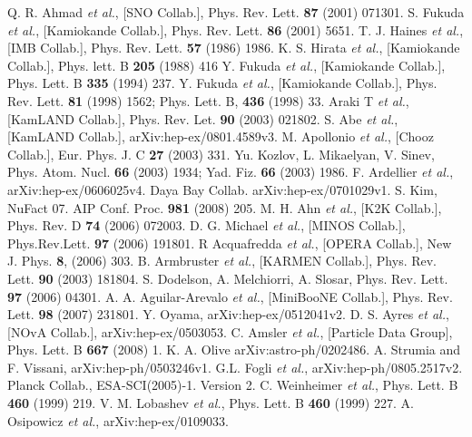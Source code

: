 \begin{thebibliography}{99}
Q. R. Ahmad \textit{et al.}, [SNO Collab.], Phys. Rev.   Lett. \textbf{87} (2001) 071301.
S. Fukuda \textit{et al.}, [Kamiokande Collab.], Phys.   Rev. Lett. \textbf{86} (2001) 5651.
T. J. Haines \textit{et al.}, [IMB Collab.], Phys. Rev.  
Lett. \textbf{57} (1986) 1986.
K. S. Hirata \textit{et al.}, [Kamiokande Collab.],  
Phys. lett. B \textbf{205} (1988) 416
Y. Fukuda \textit{et al.}, [Kamiokande Collab.], Phys.  
Lett. B \textbf{335} (1994) 237.
Y. Fukuda \textit{et al.}, [Kamiokande Collab.], Phys.  
Rev. Lett. \textbf{81} (1998) 1562; Phys. Lett. B, \textbf{436}  
(1998) 33.
Araki T \textit{et al.}, [KamLAND Collab.], Phys. Rev.   Let. \textbf{90} (2003) 021802.
S. Abe \textit{et al.}, [KamLAND Collab.],   arXiv:hep-ex/0801.4589v3.
M. Apollonio \textit{et al.}, [Chooz Collab.], Eur.   Phys. J. C \textbf{27} (2003) 331.
Yu. Kozlov, L. Mikaelyan, V. Sinev, Phys. Atom. Nucl.   \textbf{66} (2003) 1934; Yad. Fiz. \textbf{66} (2003) 1986.
F. Ardellier \textit{et al.}, arXiv:hep-ex/0606025v4.
Daya Bay Collab. arXiv:hep-ex/0701029v1.
S. Kim, NuFact 07. AIP Conf. Proc. \textbf{981} (2008)   205.
M. H. Ahn \textit{et al.}, [K2K Collab.], Phys. Rev. D   \textbf{74} (2006) 072003.
D. G. Michael \textit{et al.}, [MINOS Collab.],   Phys.Rev.Lett. \textbf{97} (2006) 191801.
R Acquafredda \textit{et al.}, [OPERA Collab.], New J. Phys. \textbf{8}, (2006) 303.
B. Armbruster \textit{et al.}, [KARMEN Collab.], Phys. Rev. Lett. \textbf{90} (2003) 181804.
S. Dodelson, A. Melchiorri, A. Slosar, Phys. Rev. Lett.   \textbf{97} (2006) 04301.
A. A. Aguilar-Arevalo \textit{et al.}, [MiniBooNE   Collab.], Phys. Rev. Lett. \textbf{98} (2007) 231801.
Y. Oyama, arXiv:hep-ex/0512041v2.
D. S. Ayres \textit{et al.}, [NOvA Collab.],   arXiv:hep-ex/0503053.
C. Amsler \textit{et al.}, [Particle Data Group], Phys. Lett. B \textbf{667} (2008) 1.
K. A. Olive arXiv:astro-ph/0202486.
A. Strumia and F. Vissani, arXiv:hep-ph/0503246v1.
G.L. Fogli \textit{et al.}, arXiv:hep-ph/0805.2517v2.
Planck Collab., ESA-SCI(2005)-1. Version 2.
C. Weinheimer \textit{et al.}, Phys. Lett. B \textbf{460} (1999) 219.
V. M. Lobashev \textit{et al.}, Phys. Lett. B \textbf{460} (1999) 227.
A. Osipowicz \textit{et al.}, arXiv:hep-ex/0109033.

\end{thebibliography}
